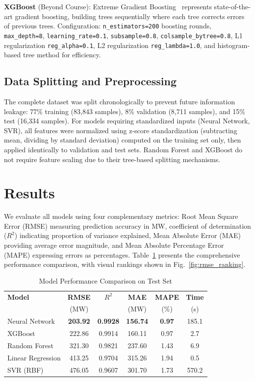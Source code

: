 \documentclass[conference]{IEEEtran}
\begin{document}
\textbf{XGBoost} (Beyond Course): Extreme Gradient Boosting~\cite{xgboost} represents state-of-the-art gradient boosting, building trees sequentially where each tree corrects errors of previous trees. Configuration: \texttt{n\_estimators=200} boosting rounds, \texttt{max\_depth=8}, \texttt{learning\_rate=0.1}, \texttt{subsample=0.8}, \texttt{colsample\_bytree=0.8}, L1 regularization \texttt{reg\_alpha=0.1}, L2 regularization \texttt{reg\_lambda=1.0}, and histogram-based tree method for efficiency.

\subsection{Data Splitting and Preprocessing}

The complete dataset was split chronologically to prevent future information leakage: 77\% training (83,843 samples), 8\% validation (8,711 samples), and 15\% test (16,334 samples). For models requiring standardized inputs (Neural Network, SVR), all features were normalized using z-score standardization (subtracting mean, dividing by standard deviation) computed on the training set only, then applied identically to validation and test sets. Random Forest and XGBoost do not require feature scaling due to their tree-based splitting mechanisms.

\section{Results}

We evaluate all models using four complementary metrics: Root Mean Square Error (RMSE) measuring prediction accuracy in MW, coefficient of determination ($R^2$) indicating proportion of variance explained, Mean Absolute Error (MAE) providing average error magnitude, and Mean Absolute Percentage Error (MAPE) expressing errors as percentages. Table~\ref{tab:results} presents the comprehensive performance comparison, with visual rankings shown in Fig.~\ref{fig:rmse_ranking}.

\begin{table}[!t]
\centering
\caption{Model Performance Comparison on Test Set}
\label{tab:results}
\begin{tabular}{lccccc}
\toprule
\textbf{Model} & \textbf{RMSE} & \textbf{$R^2$} & \textbf{MAE} & \textbf{MAPE} & \textbf{Time} \\
 & (MW) & & (MW) & (\%) & (s) \\
\midrule
Neural Network & \textbf{203.92} & \textbf{0.9928} & \textbf{156.74} & \textbf{0.97} & 185.1 \\
XGBoost & 222.86 & 0.9914 & 160.11 & 0.97 & 2.7 \\
Random Forest & 321.30 & 0.9821 & 237.60 & 1.43 & 6.9 \\
Linear Regression & 413.25 & 0.9704 & 315.26 & 1.94 & 0.5 \\
SVR (RBF) & 476.05 & 0.9607 & 301.70 & 1.73 & 570.2 \\
\bottomrule
\end{tabular}
\end{table}
\end{document}
